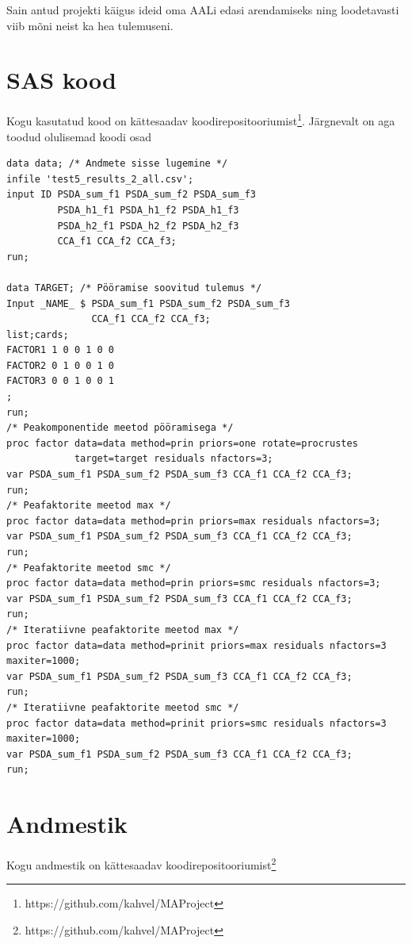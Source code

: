 \documentclass[a4paper,12pt]{report}
\begin{document}
Sain antud projekti käigus ideid oma AALi edasi arendamiseks ning loodetavasti viib mõni neist ka hea tulemuseni.

\appendix
\chapter{SAS kood}\label{lisa1}

Kogu kasutatud kood on kättesaadav koodirepositooriumist\footnote{https://github.com/kahvel/MAProject}. Järgnevalt on aga toodud olulisemad koodi osad

\begin{verbatim}
data data; /* Andmete sisse lugemine */
infile 'test5_results_2_all.csv';
input ID PSDA_sum_f1 PSDA_sum_f2 PSDA_sum_f3
         PSDA_h1_f1 PSDA_h1_f2 PSDA_h1_f3
         PSDA_h2_f1 PSDA_h2_f2 PSDA_h2_f3
         CCA_f1 CCA_f2 CCA_f3;
run;

data TARGET; /* Pööramise soovitud tulemus */
Input _NAME_ $ PSDA_sum_f1 PSDA_sum_f2 PSDA_sum_f3
               CCA_f1 CCA_f2 CCA_f3;
list;cards;
FACTOR1 1 0 0 1 0 0
FACTOR2 0 1 0 0 1 0
FACTOR3 0 0 1 0 0 1
;
run;
/* Peakomponentide meetod pööramisega */
proc factor data=data method=prin priors=one rotate=procrustes
            target=target residuals nfactors=3;
var PSDA_sum_f1 PSDA_sum_f2 PSDA_sum_f3 CCA_f1 CCA_f2 CCA_f3;
run;
/* Peafaktorite meetod max */
proc factor data=data method=prin priors=max residuals nfactors=3;
var PSDA_sum_f1 PSDA_sum_f2 PSDA_sum_f3 CCA_f1 CCA_f2 CCA_f3;
run;
/* Peafaktorite meetod smc */
proc factor data=data method=prin priors=smc residuals nfactors=3;
var PSDA_sum_f1 PSDA_sum_f2 PSDA_sum_f3 CCA_f1 CCA_f2 CCA_f3;
run;
/* Iteratiivne peafaktorite meetod max */
proc factor data=data method=prinit priors=max residuals nfactors=3 maxiter=1000;
var PSDA_sum_f1 PSDA_sum_f2 PSDA_sum_f3 CCA_f1 CCA_f2 CCA_f3;
run;
/* Iteratiivne peafaktorite meetod smc */
proc factor data=data method=prinit priors=smc residuals nfactors=3 maxiter=1000;
var PSDA_sum_f1 PSDA_sum_f2 PSDA_sum_f3 CCA_f1 CCA_f2 CCA_f3;
run;
\end{verbatim}
\chapter{Andmestik}\label{andmestik}
Kogu andmestik on kättesaadav koodirepositooriumist\footnote{https://github.com/kahvel/MAProject}
\end{document}
